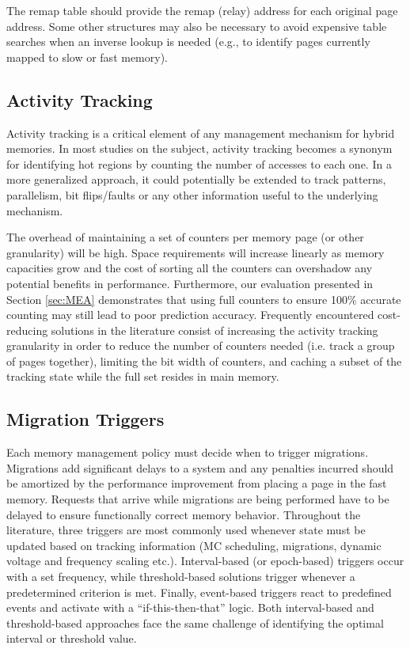 The remap table should provide the remap (relay) address for each original
page address.  Some other structures may also be necessary to avoid expensive
table searches when an inverse lookup is needed (e.g., to identify pages
currently mapped to slow or fast memory).

\subsection{Activity Tracking}
\label{sec:tracking}

Activity tracking is a critical element of any management mechanism for hybrid memories. In most studies on the subject, activity tracking becomes a synonym for identifying hot regions by counting the number of accesses to each one. In a more generalized approach, it could potentially be extended to track patterns, parallelism, bit flips/faults or any other information useful to the underlying mechanism.

The overhead of maintaining a set of counters per memory page (or other granularity) will be high. Space requirements will increase linearly as memory capacities grow and the cost of sorting all the counters can overshadow any potential benefits in performance. Furthermore, our evaluation presented in Section \ref{sec:MEA} demonstrates that using full counters to ensure 100\% accurate counting may still lead to poor prediction accuracy. Frequently encountered cost-reducing solutions in the literature consist of increasing the activity tracking granularity in order to reduce the number of counters needed (i.e. track a group of pages together), limiting the bit width of counters, and caching a subset of the tracking state while the full set resides in main memory. 


\subsection{Migration Triggers}

Each memory management policy must decide when to trigger migrations. 
Migrations add significant delays to a system and any penalties incurred should be amortized by the performance improvement from placing a page in the fast memory. Requests that arrive while migrations are being performed have to be delayed to ensure functionally correct memory behavior. Throughout the literature, three triggers are most commonly used whenever state must be updated based on tracking information (MC scheduling, migrations, dynamic voltage and frequency scaling etc.). Interval-based (or epoch-based) triggers occur with a set frequency, while threshold-based solutions trigger whenever a predetermined criterion is met. Finally, event-based triggers react to predefined events and activate with a ``if-this-then-that'' logic. 
Both interval-based and threshold-based approaches face the same challenge of identifying the optimal interval or threshold value. 

